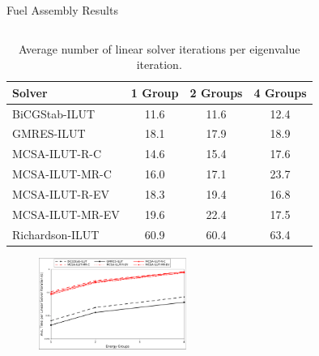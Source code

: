 \documentclass{beamer}
\begin{document}
\begin{frame}{Fuel Assembly Results}

  \begin{columns}

    \begin{column}{0.5\textwidth}

      {\tiny
      \begin{table}[h!]
        \begin{center}
          \begin{tabular}{lccc}\hline\hline
            \multicolumn{1}{l}{Solver}&
            \multicolumn{1}{c}{1 Group}&
            \multicolumn{1}{c}{2 Groups}&
            \multicolumn{1}{c}{4 Groups}\\
            \hline
            BiCGStab-ILUT & 11.6 & 11.6 & 12.4 \\ 
            GMRES-ILUT & 18.1 & 17.9 & 18.9 \\
            MCSA-ILUT-R-C & 14.6 & 15.4 & 17.6 \\
            MCSA-ILUT-MR-C & 16.0 & 17.1 & 23.7 \\
            MCSA-ILUT-R-EV & 18.3 & 19.4 & 16.8 \\
            MCSA-ILUT-MR-EV & 19.6 & 22.4 & 17.5 \\
            Richardson-ILUT & 60.9 & 60.4 & 63.4 \\
            \hline\hline
          \end{tabular}
        \end{center}
        \caption{Average number of linear solver iterations per
          eigenvalue iteration.}
      \end{table}
      }

      \begin{figure}[htpb!]
        \begin{center}
          \includegraphics[width=1.9in]{solver_time.pdf}
        \end{center}
      \end{figure}

    \end{column}


\end{columns}
\end{frame}
\end{document}
